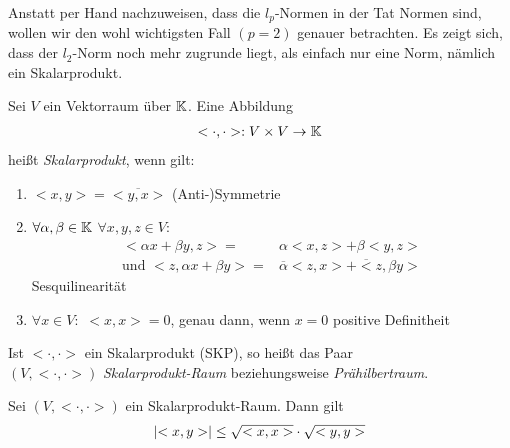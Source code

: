 
Anstatt per Hand nachzuweisen, dass die $l_p$-Normen in der Tat Normen sind, 
wollen wir den wohl wichtigsten Fall $(p=2)$ genauer betrachten. Es zeigt sich, 
dass der $l_2$-Norm noch mehr zugrunde liegt, als einfach nur eine Norm, nämlich 
ein Skalarprodukt.

\begin{Definition}{%
	Sei $V$ ein Vektorraum über $\mathbb{K}$. Eine Abbildung 
	\begin{align*}
		< \cdot, \cdot >: V \times V \rightarrow \mathbb{K}
	\end{align*}		
	heißt \emph{Skalarprodukt}, wenn gilt:
	\begin{enumerate}[label=\subscript{S}{{\arabic*}}]
		\item \label{def:skalprod:1}$<x,y> = \overline{<y,x>}$ \glqq (Anti-)Symmetrie\grqq{}
		\item \label{def:skalprod:2} $\forall \alpha,\beta \in \mathbb{K}$ $\forall x,y,z \in V:$
		\begin{align*}
			<\alpha x + \beta y, z > = & \alpha <x,z> + \beta <y,z> \\
			\text{und } <z, \alpha x + \beta y > = &\overline{\alpha} <z,x> 
				+ \overline <z, \beta y >
		\end{align*}
		\glqq Sesquilinearität\grqq{}
		\item \label{def:skalprod:3} $\forall x \in V:$ $<x,x> = 0$, genau dann, wenn $x = 0$
		\glqq positive Definitheit\grqq{}
	\end{enumerate}
	Ist $<\cdot, \cdot>$ ein Skalarprodukt (SKP), so heißt das Paar \\
	$(V, <\cdot,\cdot>)$ \emph{Skalarprodukt-Raum} beziehungsweise 
	\emph{Prähilbertraum}.
}\end{Definition}

\begin{Lemma}{%
	Sei $(V, <\cdot,\cdot>)$ ein Skalarprodukt-Raum. Dann gilt
	\begin{align*}
		\abs{<x,y>} \leq \sqrt{<x,x>} \cdot \sqrt{<y,y>}
	\end{align*}
}\end{Lemma}


